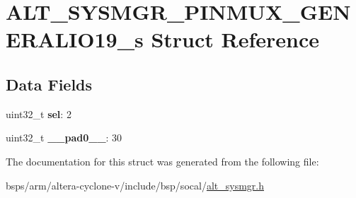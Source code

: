 \hypertarget{structALT__SYSMGR__PINMUX__GENERALIO19__s}{}\section{A\+L\+T\+\_\+\+S\+Y\+S\+M\+G\+R\+\_\+\+P\+I\+N\+M\+U\+X\+\_\+\+G\+E\+N\+E\+R\+A\+L\+I\+O19\+\_\+s Struct Reference}
\label{structALT__SYSMGR__PINMUX__GENERALIO19__s}
\subsection*{Data Fields}
\begin{DoxyCompactItemize}
\item 
\mbox{\label{structALT__SYSMGR__PINMUX__GENERALIO19__s_a16d35d70027e061a80234e783f90c636}} 
uint32\+\_\+t {\bfseries sel}\+: 2
\item 
\mbox{\label{structALT__SYSMGR__PINMUX__GENERALIO19__s_a45e3b30d67f533135e9fcb1db22aacab}} 
uint32\+\_\+t {\bfseries \+\_\+\+\_\+pad0\+\_\+\+\_\+}\+: 30
\end{DoxyCompactItemize}


The documentation for this struct was generated from the following file\+:\begin{DoxyCompactItemize}
\item 
bsps/arm/altera-\/cyclone-\/v/include/bsp/socal/\mbox{\hyperlink{alt__sysmgr_8h}{alt\+\_\+sysmgr.\+h}}\end{DoxyCompactItemize}

